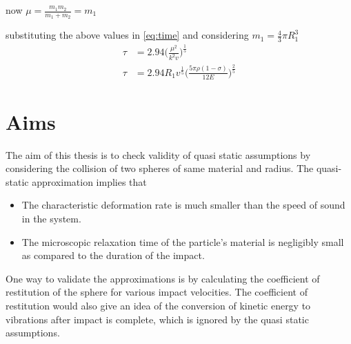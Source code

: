 now $\mu=\frac{m_{1}m_{2}}{m_{1}+m_{2}}=m_{1}$

substituting the above values in \ref{eq:time} and considering $m_{1}=\frac{4}{3}\pi R_{1}^{3}$
\begin{align*}
\tau &= 2.94 \Big( \frac{\mu^{2}}{k^{2}v} \Big)^{\frac{1}{5}} \\
\tau &= 2.94R_{1}v^{\frac{1}{5}} \Big( \frac{5\pi \rho (1-\sigma)}{12E} \Big)^{\frac{2}{5}}
\end{align*}



\section{Aims}

The aim of this thesis is to check validity of quasi static assumptions by considering the collision of two spheres of same material and radius. The quasi-static approximation implies that
\begin{itemize}
\item The characteristic deformation rate is much smaller than the speed of sound in the system.
\item The microscopic relaxation time of the particle's material is negligibly small as compared to the duration of the impact.
\end{itemize}
One way to validate the approximations is by calculating the coefficient of restitution of the sphere for various impact velocities. The coefficient of restitution would also give an idea of the conversion of kinetic energy to vibrations after impact is complete, which is ignored by the quasi static assumptions.
